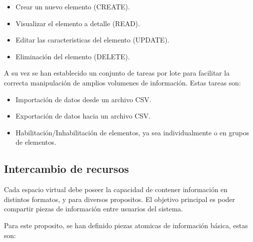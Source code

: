 \begin{itemize}
\item Crear un nuevo elemento (CREATE).
\item Visualizar el elemento a detalle (READ).
\item Editar las caracteristicas del elemento (UPDATE).
\item Eliminación del elemento (DELETE).
\end{itemize}

A su vez se han establecido un conjunto de tareas por lote para facilitar la
correcta manipulación de amplios volumenes de información. Estas tareas son:

\begin{itemize}
\item Importación de datos desde un archivo CSV.
\item Exportación de datos hacia un archivo CSV.
\item Habilitación/Inhabilitación de elementos, ya sea individualmente o en
      grupos de elementos.
\end{itemize}

\subsection{Intercambio de recursos}

Cada espacio virtual debe poseer la capacidad de contener información en
distintos formatos, y para diversos propositos. El objetivo principal es poder
compartir piezas de información entre usuarios del sistema.

Para este proposito, se han definido piezas atomicas de información básica,
estas son:

